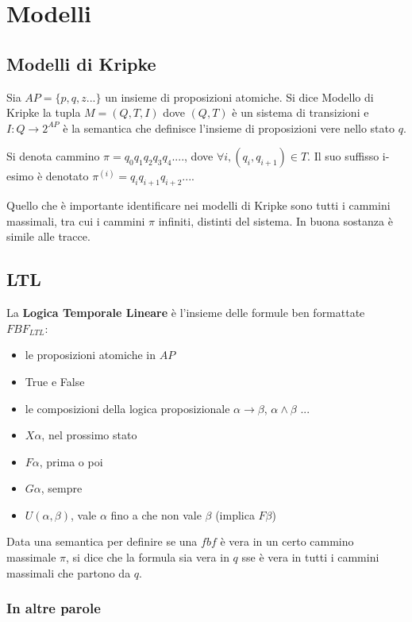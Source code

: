 \chapter{Modelli}

\section{Modelli di Kripke}

Sia $AP = \{p, q, z ... \}$ un insieme di proposizioni atomiche. Si dice Modello di Kripke la tupla $M = (Q, T, I)$ dove $(Q, T)$ \`e un sistema di transizioni e $I : Q \rightarrow 2^{AP}$ \`e la semantica che definisce l'insieme di proposizioni vere nello stato $q$.

Si denota cammino $\pi = q_0q_1q_2q_3q_4....$, dove $\forall i, (q_i, q_{i+1}) \in T$.
Il suo suffisso i-esimo \`e denotato $\pi^{(i)} = q_{i}q_{i+1}q_{i+2}...$.

Quello che \`e importante identificare nei modelli di Kripke sono tutti i cammini massimali, tra cui i cammini $\pi$ infiniti, distinti del sistema. In buona sostanza \`e simile alle tracce.

\section{LTL}

La \textbf{Logica Temporale Lineare} \`e l'insieme delle formule ben formattate $FBF_{LTL}$:
\begin{itemize}
    \item le proposizioni atomiche in $AP$
    \item True e False
    \item le composizioni della logica proposizionale $\alpha \rightarrow \beta$, $\alpha \land \beta$ ...
    \item $X\alpha$, nel prossimo stato
    \item $F\alpha$, prima o poi
    \item $G\alpha$, sempre
    \item $U(\alpha, \beta)$, vale $\alpha$ fino a che non vale $\beta$ (implica $F\beta$)
\end{itemize}

Data una semantica per definire se una $fbf$ \`e vera in un certo cammino massimale $\pi$, si dice che la formula sia vera in $q$ sse \`e vera in tutti i cammini massimali che partono da $q$.

\subsection{In altre parole}

